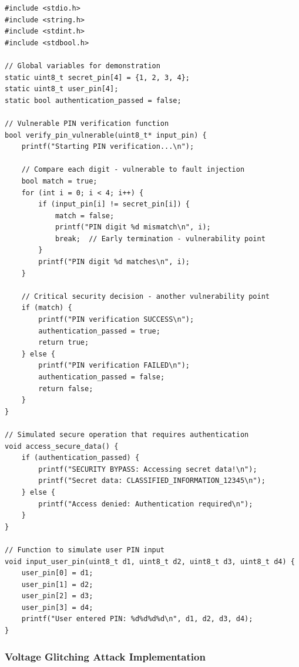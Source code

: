 \documentclass[12pt,a4paper]{article}
\begin{document}
\begin{lstlisting}[caption={Vulnerable PIN Verification System}]
#include <stdio.h>
#include <string.h>
#include <stdint.h>
#include <stdbool.h>

// Global variables for demonstration
static uint8_t secret_pin[4] = {1, 2, 3, 4};
static uint8_t user_pin[4];
static bool authentication_passed = false;

// Vulnerable PIN verification function
bool verify_pin_vulnerable(uint8_t* input_pin) {
    printf("Starting PIN verification...\n");
    
    // Compare each digit - vulnerable to fault injection
    bool match = true;
    for (int i = 0; i < 4; i++) {
        if (input_pin[i] != secret_pin[i]) {
            match = false;
            printf("PIN digit %d mismatch\n", i);
            break;  // Early termination - vulnerability point
        }
        printf("PIN digit %d matches\n", i);
    }
    
    // Critical security decision - another vulnerability point
    if (match) {
        printf("PIN verification SUCCESS\n");
        authentication_passed = true;
        return true;
    } else {
        printf("PIN verification FAILED\n"); 
        authentication_passed = false;
        return false;
    }
}

// Simulated secure operation that requires authentication
void access_secure_data() {
    if (authentication_passed) {
        printf("SECURITY BYPASS: Accessing secret data!\n");
        printf("Secret data: CLASSIFIED_INFORMATION_12345\n");
    } else {
        printf("Access denied: Authentication required\n");
    }
}

// Function to simulate user PIN input
void input_user_pin(uint8_t d1, uint8_t d2, uint8_t d3, uint8_t d4) {
    user_pin[0] = d1;
    user_pin[1] = d2; 
    user_pin[2] = d3;
    user_pin[3] = d4;
    printf("User entered PIN: %d%d%d%d\n", d1, d2, d3, d4);
}
\end{lstlisting}

\subsubsection{Voltage Glitching Attack Implementation}
\end{document}
